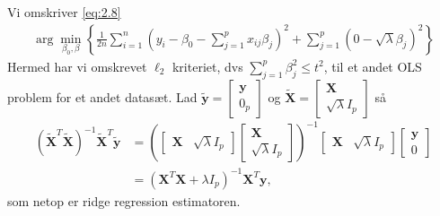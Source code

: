 \begin{sol}
Vi omskriver \eqref{eq:2.8}
\begin{align*}
\arg\min_{\beta_0, \beta} \left\lbrace \frac{1}{2n} \sum_{i=1}^n \left(y_i - \beta_0 - \sum_{j=1}^p x_{ij} \beta_j \right)^2 + \sum_{j=1}^p \left( 0 - \sqrt{\lambda} \beta_j \right)^2 \right\rbrace
\end{align*}
Hermed har vi omskrevet $\ell_2$ kriteriet, dvs $\sum_{j=1}^p \beta_j^2 \leq t^2$, til et andet OLS problem for et andet datasæt.
Lad $\tilde{\mathbf{y}} = \begin{bmatrix}
\mathbf{y} \\ 0_p
\end{bmatrix}$ og $\tilde{\mathbf{X}} = \begin{bmatrix}
\mathbf{X} \\ \sqrt{\lambda} I_p
\end{bmatrix}$
så
\begin{align*}
(\tilde{\mathbf{X}}^T \tilde{\mathbf{X}})^{-1} \tilde{\mathbf{X}}^T \tilde{\mathbf{y}} 
&= \left( \begin{bmatrix}
\mathbf{X} & \sqrt{\lambda} I_p
\end{bmatrix}
\begin{bmatrix}
\mathbf{X} \\ \sqrt{\lambda} I_p
\end{bmatrix} \right)^{-1}
\begin{bmatrix}
\mathbf{X} & \sqrt{\lambda} I_p
\end{bmatrix}
\begin{bmatrix}
\mathbf{y} \\ 0
\end{bmatrix} \\
&= \left( \mathbf{X}^T \mathbf{X} + \lambda I_p \right)^{-1} \mathbf{X}^T \mathbf{y},
\end{align*}
som netop er ridge regression estimatoren.
\end{sol}

